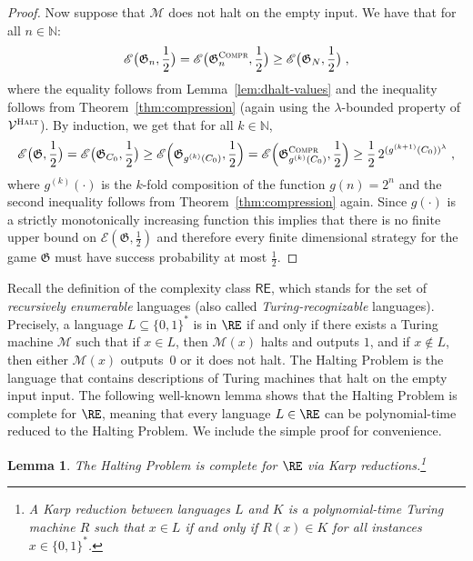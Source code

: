 \documentclass[11pt]{article}
\newtheorem{lemma}[theorem]{Lemma}
\theoremstyle{definition}
\newcommand{\N}{\ensuremath{\mathbb{N}}}
\newcommand{\game}{\mathfrak{G}}
\newcommand{\verifier}{\mathcal{V}}
\newcommand{\Ent}{\mathscr{E}}
\newcommand{\compr}{\textsc{Compr}}
\newcommand{\halt}{\textsc{Halt}}
\newcommand{\machine}{\cal{M}}
\renewcommand{\cal}[1]{\mathcal{#1}}
\begin{document}
\begin{proof}
	Now suppose that $\machine$ does not halt on the empty input.
  We have that for all $n \in \N$:
  \begin{equation*}
		\Ent\big(\game_n,\frac{1}{2}\big) = \Ent\big(\game^\compr_n,\frac{1}{2}\big) \geq
    \Ent\big(\game_{N},\frac{1}{2}\big)\;,
  \end{equation*}
	where the equality follows from Lemma~\ref{lem:dhalt-values} and the
  inequality follows from Theorem~\ref{thm:compression} (again using the
  $\lambda$-bounded property of $\verifier^\halt$).
  By induction, we get that for all $k \in \N$,
  \begin{equation*}
		\Ent\big(\game,\frac{1}{2}\big) = \Ent\big(\game_{C_0}, \frac{1}{2}\big) \geq
    \Ent \Bigl( \game_{g^{(k)}(C_0)}, \frac{1}{2} \Bigr) =
    \Ent \Bigl( \game^\compr_{g^{(k)}(C_0)}, \frac{1}{2} \Bigr) \geq
    \frac{1}{2} \, 2^{(g^{(k+1)}(C_0))^\lambda }\;,
  \end{equation*}
	where $g^{(k)}(\cdot)$ is the $k$-fold composition of the function $g(n) =
  2^{n}$ and the second inequality follows from Theorem~\ref{thm:compression}
  again.
  Since $g(\cdot)$ is a strictly monotonically increasing function this implies that there is no finite upper bound on
  $\Ent(\game,\frac{1}{2})$ and therefore every finite dimensional strategy for the
  game $\game$ must have success probability at most $\frac{1}{2}$.
\end{proof}

Recall the definition of the complexity class $\mathsf{RE}$, which stands for
the set of \emph{recursively enumerable} languages (also called
\emph{Turing-recognizable} languages).
Precisely, a language $L \subseteq \{0,1\}^*$ is in $\RE$ if and only if there
exists a Turing machine $\cal{M}$ such that if $x \in L$, then $\cal{M}(x)$
halts and outputs $1$, and if $x \notin L$, then either $\cal{M}(x)$ outputs~$0$
or it does not halt.
The Halting Problem is the language that contains descriptions of Turing
machines that halt on the empty input input.
The following well-known lemma shows that the Halting Problem is complete for
$\RE$, meaning that every language $L \in \RE$ can be polynomial-time reduced
to the Halting Problem. We include the simple proof for convenience. 

\begin{lemma}
  The Halting Problem is complete for $\RE$ via Karp reductions.\footnote{A \emph{Karp reduction} between languages $L$ and $K$ is a polynomial-time Turing machine $R$ such that $x \in L$ if and only if $R(x) \in K$ for all instances $x \in \{0,1\}^*$.}
\end{lemma}
\end{document}
